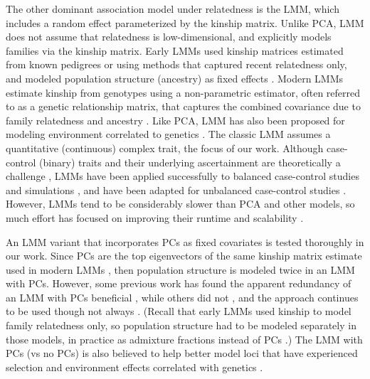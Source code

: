\documentclass[11pt]{article}
\begin{document}
\begin{linenumbers}
The other dominant association model under relatedness is the LMM, which includes a random effect parameterized by the kinship matrix.
Unlike PCA, LMM does not assume that relatedness is low-dimensional, and explicitly models families via the kinship matrix.
Early LMMs used kinship matrices estimated from known pedigrees or using methods that captured recent relatedness only, and modeled population structure (ancestry) as fixed effects \citep{yu_unified_2006, zhao_arabidopsis_2007, zhu_nonmetric_2009}.
Modern LMMs estimate kinship from genotypes using a non-parametric estimator, often referred to as a genetic relationship matrix, that captures the combined covariance due to family relatedness and ancestry \citep{kang_efficient_2008, astle_population_2009, ochoa_estimating_2021}.
Like PCA, LMM has also been proposed for modeling environment correlated to genetics \citep{vilhjalmsson_nature_2013, wang_trade-offs_2022}.
The classic LMM assumes a quantitative (continuous) complex trait, the focus of our work.
Although case-control (binary) traits and their underlying ascertainment are theoretically a challenge \citep{yang_advantages_2014}, LMMs have been applied successfully to balanced case-control studies \citep{astle_population_2009, kang_variance_2010} and simulations \citep{price_new_2010, wu_comparison_2011, sul_mixed_2013}, and have been adapted for unbalanced case-control studies \citep{zhou_efficiently_2018}.
However, LMMs tend to be considerably slower than PCA and other models, so much effort has focused on improving their runtime and scalability \citep{aulchenko_genomewide_2007, kang_efficient_2008, kang_variance_2010, zhang_mixed_2010, lippert_fast_2011, yang_gcta:_2011, listgarten_improved_2012, zhou_genome-wide_2012, svishcheva_rapid_2012, loh_efficient_2015, zhou_efficiently_2018}.

An LMM variant that incorporates PCs as fixed covariates is tested thoroughly in our work.
Since PCs are the top eigenvectors of the same kinship matrix estimate used in modern LMMs \citep{astle_population_2009, janss_inferences_2012, hoffman_correcting_2013, zhang_principal_2015}, then population structure is modeled twice in an LMM with PCs.
However, some previous work has found the apparent redundancy of an LMM with PCs beneficial \citep{price_new_2010, tucker_improving_2014, zhang_principal_2015}, while others did not \citep{liu_controlling_2011, janss_inferences_2012}, and the approach continues to be used \citep{zeng_signatures_2018, mbatchou_computationally_2021} though not always \citep{matoba_gwas_2020}.
(Recall that early LMMs used kinship to model family relatedness only, so population structure had to be modeled separately in those models, in practice as admixture fractions instead of PCs \citep{yu_unified_2006, zhao_arabidopsis_2007, zhu_nonmetric_2009}.)
The LMM with PCs (vs no PCs) is also believed to help better model loci that have experienced selection \citep{price_new_2010, vilhjalmsson_nature_2013} and environment effects correlated with genetics \citep{zhang_principal_2015}.


\end{linenumbers}
\end{document}
